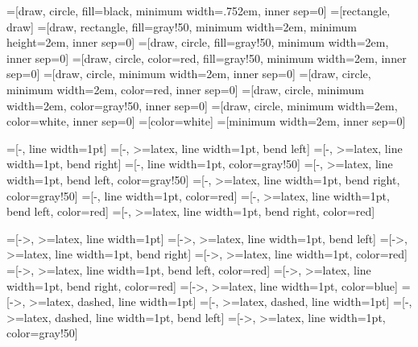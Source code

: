 \newcommand{\nodesize}{2em}
\newcommand{\edgeunit}{2.5*\nodesize}
\newcommand{\edgewidth}{1pt}
=[draw, circle, fill=black, minimum width=.75\nodesize, inner sep=0]
=[rectangle, draw]
=[draw, rectangle, fill=gray!50, minimum width=\nodesize, minimum height=\nodesize, inner sep=0]
=[draw, circle, fill=gray!50, minimum width=\nodesize, inner sep=0]
=[draw, circle, color=red, fill=gray!50, minimum width=\nodesize, inner sep=0]
=[draw, circle, minimum width=\nodesize, inner sep=0]
=[draw, circle, minimum width=\nodesize, color=red, inner sep=0]
=[draw, circle, minimum width=\nodesize, color=gray!50, inner sep=0]
=[draw, circle, minimum width=\nodesize, color=white, inner sep=0]
=[color=white]
=[minimum width=\nodesize, inner sep=0]

=[-, line width=\edgewidth]
=[-, >=latex, line width=\edgewidth, bend left]
=[-, >=latex, line width=\edgewidth, bend right]
=[-, line width=\edgewidth, color=gray!50]
=[-, >=latex, line width=\edgewidth, bend left, color=gray!50]
=[-, >=latex, line width=\edgewidth, bend right, color=gray!50]
=[-, line width=\edgewidth, color=red]
=[-, >=latex, line width=\edgewidth, bend left, color=red]
=[-, >=latex, line width=\edgewidth, bend right, color=red]

=[->, >=latex, line width=\edgewidth]
=[->, >=latex, line width=\edgewidth, bend left]
=[->, >=latex, line width=\edgewidth, bend right]
=[->, >=latex, line width=\edgewidth, color=red]
=[->, >=latex, line width=\edgewidth, bend left, color=red]
=[->, >=latex, line width=\edgewidth, bend right, color=red]
=[->, >=latex, line width=\edgewidth, color=blue]
=[->, >=latex, dashed, line width=\edgewidth]
=[-, >=latex, dashed, line width=\edgewidth]
=[-, >=latex, dashed, line width=\edgewidth, bend left]
=[->, >=latex, line width=\edgewidth, color=gray!50]
